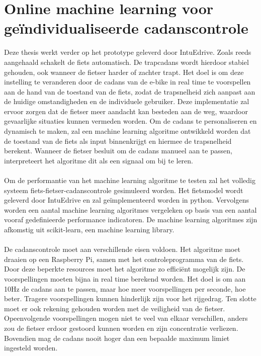 \documentclass[12pt,a4paper,oneside]{book}
\begin{document}
\section{Online machine learning voor geïndividualiseerde cadanscontrole}
Deze thesis werkt verder op het prototype geleverd door IntuEdrive. Zoals reeds aangehaald schakelt de fiets automatisch. De trapcadans wordt hierdoor stabiel gehouden, ook wanneer de fietser harder of zachter trapt. Het doel is om deze instelling te veranderen door de cadans van de e-bike in real time te voorspellen aan de hand van de toestand van de fiets, zodat de trapsnelheid zich aanpast aan de huidige omstandigheden en de individuele gebruiker. Deze implementatie zal ervoor zorgen dat de fietser meer aandacht kan besteden aan de weg, waardoor gevaarlijke situaties kunnen vermeden worden. Om de cadans te personaliseren en dynamisch te maken, zal een machine learning algoritme ontwikkeld worden dat de toestand van de fiets als input binnenkrijgt en hiermee de trapsnelheid berekent. Wanneer de fietser besluit om de cadans manueel aan te passen, interpreteert het algoritme dit als een signaal om bij te leren.
\\\\
Om de performantie van het machine learning algoritme te testen zal het volledig systeem fiets-fietser-cadanscontrole gesimuleerd worden. Het fietsmodel wordt geleverd door IntuEdrive en zal geïmplementeerd worden in python. Vervolgens worden een aantal machine learning algoritmes vergeleken op basis van een aantal vooraf gedefinieerde performance indicatoren. De machine learning algoritmes zijn afkomstig uit scikit-learn, een machine learning library.
\\\\
De cadanscontrole moet aan verschillende eisen voldoen. Het algoritme moet draaien op een Raspberry Pi, samen met het controleprogramma van de fiets. Door deze beperkte resources moet het algoritme zo efficiënt mogelijk zijn. De voorspellingen moeten bijna in real time berekend worden. Het doel is om aan 10Hz de cadans aan te passen, maar hoe meer voorspellingen per seconde, hoe beter. Tragere voorspellingen kunnen hinderlijk zijn voor het rijgedrag. Ten slotte moet er ook rekening gehouden worden met de veiligheid van de fietser. Opeenvolgende voorspellingen mogen niet te veel van elkaar verschillen, anders zou de fietser erdoor gestoord kunnen worden en zijn concentratie verliezen. Bovendien mag de cadans nooit hoger dan een bepaalde maximum limiet ingesteld worden.
\\\\
\end{document}
